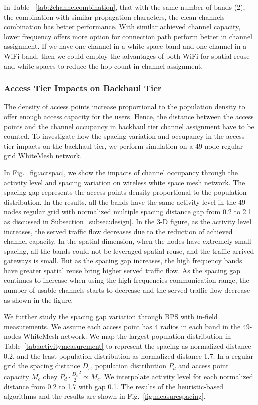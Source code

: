 In Table ~\ref{tab:2channelcombination}, that with the same number of bands (2), 
the combination with similar propagation characters, the clean channels combination 
has better performance. With similar achieved channel capacity, lower frequency 
offers more option for connection path perform better in channel assignment. 
If we have one channel in a white space band and one channel in a WiFi band, then 
we could employ the advantages of both WiFi for spatial reuse and white spaces to 
reduce the hop count in channel assignment. 

\subsubsection{Access Tier Impacts on Backhaul Tier}

The density of access points increase proportional to the population 
density to offer enough access capacity for the users. Hence, the distance between the access points and the channel 
occupancy in backhaul tier channel assignment have to be counted. To investigate how the spacing variation 
and occupancy in the access tier impacts on the backhaul tier, we perform simulation on a 
49-node regular grid WhiteMesh network. 

In Fig.~\ref{fig:actspac}, we show the impacts of channel occupancy through 
the activity level and spacing variation on wireless white space mesh network. 
The spacing gap represents the access points density proportional to the 
population distribution. In the results, all the bands have the same activity 
level in the 49-nodes regular grid with normalized multiple spacing distance gap 
from 0.2 to 2.1 as discussed in Subsection~\ref{subsec:design}. In the 3-D figure, 
as the activity level increases, the served traffic flow decreases due to the reduction 
of achieved channel capacity. In the spatial dimension, when the nodes have extremely
small spacing, all the bands could not be leveraged spatial reuse, and the traffic 
arrived gateways is small. But as the spacing gap increases, the high frequency bands 
have greater spatial reuse bring higher served traffic flow. As the spacing gap continues 
to increase when using the high frequencies communication range, the number of usable channels 
starts to decrease and the served traffic flow decrease as shown in the figure.

We further study the spacing gap variation through BPS with in-field measurements.
We assume each access point has 4 radios in each band in the 49-nodes WhiteMesh network.
We map the largest population distribution in Table~\ref{tab:activitymeasurement} to 
represent the spacing as normalized distance 0.2, and the least population distribution 
as normalized distance 1.7. In a regular grid the spacing distance $D_s$, population 
distribution $P_d$ and access point capacity $M_c$ obey $P_d \cdot \frac{D_s}{2} ^2 \propto M_c$. 
We interpolate activity level for each normalized distance from 0.2 to 1.7 with gap 0.1. 
The results of the heuristic-based algorithms and the results are shown in Fig.~\ref{fig:measurespacing}.

